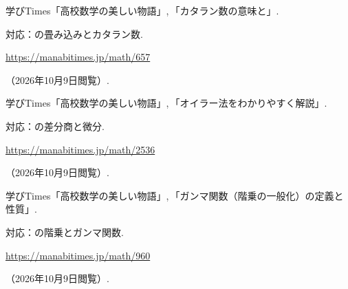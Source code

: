 \begin{enumerate}[resume,label={[\arabic*]}]
    \item \begin{minipage}[t]{\linewidth}\raggedright
        学びTimes「高校数学の美しい物語」,\,「カタラン数の意味と」.
        \par{\small 対応：の畳み込みとカタラン数.\par}
        \par\noindent\url{https://manabitimes.jp/math/657}\par
        \noindent（2026年10月9日閲覧）.
      \end{minipage}\par\smallskip

    \item \begin{minipage}[t]{\linewidth}\raggedright
        学びTimes「高校数学の美しい物語」,\,「オイラー法をわかりやすく解説」.
        \par{\small 対応：の差分商と微分.\par}
        \par\noindent\url{https://manabitimes.jp/math/2536}\par
        \noindent（2026年10月9日閲覧）.
      \end{minipage}\par\smallskip

    \item \begin{minipage}[t]{\linewidth}\raggedright
        学びTimes「高校数学の美しい物語」,\,「ガンマ関数（階乗の一般化）の定義と性質」.
        \par{\small 対応：の階乗とガンマ関数.\par}
        \par\noindent\url{https://manabitimes.jp/math/960}\par
        \noindent（2026年10月9日閲覧）.
      \end{minipage}\par\smallskip

  \end{enumerate}

